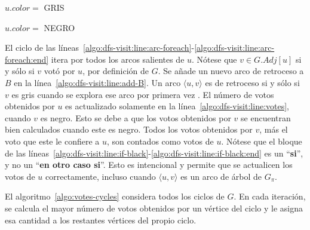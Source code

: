 \begin{algorithm}[!h]
    \caption{\dfsvisitcaption}
    \label{algo:dfs-visit}
    \DontPrintSemicolon
    \BlankLine

    $u.color =$ GRIS\;

    \label{algo:dfs-visit:line:arc-foreach:end}
    $u.color =$ NEGRO\;
\end{algorithm}

El ciclo de las l\'ineas~\ref{algo:dfs-visit:line:arc-foreach}-\ref{algo:dfs-visit:line:arc-foreach:end} itera por todos los arcos salientes de $u$. N\'otese que $v \in G.Adj[u]$ si y s\'olo si $v$ vot\'o por $u$, por definici\'on de $G$.  Se a\~nade un nuevo arco de retroceso a $B$ en la l\'inea~\ref{algo:dfs-visit:line:add-B}. Un arco $\langle u, v \rangle$ es de retroceso si y s\'olo si $v$ es gris cuando se explora ese arco por primera vez \citep{intro-to-algo-3}. El n\'umero de votos obtenidos por $u$ es actualizado solamente en la l\'inea~\ref{algo:dfs-visit:line:votes}, cuando $v$ es negro. Esto se debe a que los votos obtenidos por $v$ se encuentran bien calculados cuando este es negro. Todos los votos obtenidos por $v$, m\'as el voto que este le confiere a $u$, son contados como votos de  $u$. N\'otese que el bloque de las l\'ineas~\ref{algo:dfs-visit:line:if-black}-\ref{algo:dfs-visit:line:if-black:end} es un ``\textbf{si}'', y no un ``\textbf{en otro caso si}''. Esto es intencional y permite que se actualicen los votos de $u$ correctamente, incluso cuando $\langle u, v \rangle$ es un arco de \'arbol de $G_\pi$. 

El algoritmo~\ref{algo:votes-cycles} considera todos los ciclos de $G$. En cada iteraci\'on, se calcula el mayor n\'umero de votos obtenidos por un v\'ertice del ciclo y le asigna esa cantidad a los restantes v\'ertices del propio ciclo. 


\begin{algorithm}[!h]
    \caption{\cyclevotescaption}
    \label{algo:votes-cycles}
    \DontPrintSemicolon
    \SetAlgoLined
    \BlankLine

\end{algorithm}

